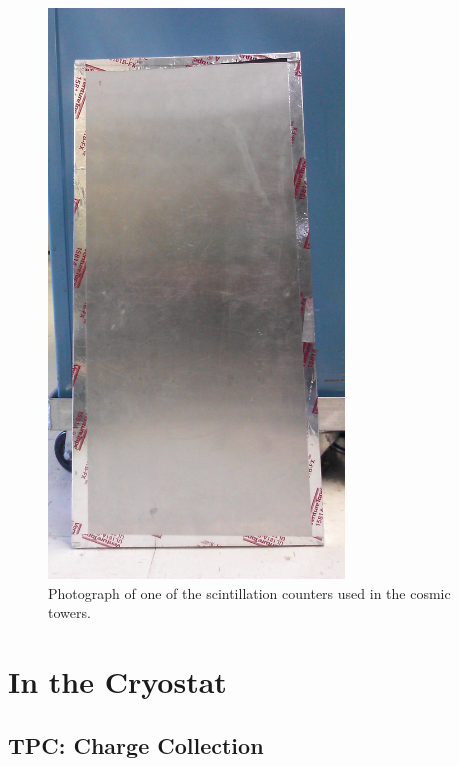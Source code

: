 \begin{figure}[h!]
\centering
 \includegraphics[angle=90,width=0.7\textwidth]{Chapter-2/Images/Cosmic_Paddle.jpg}
\caption{Photograph of one of the scintillation counters used in the cosmic towers. } 
\label{pic:cosmicpaddle}
\end{figure}






\section{In the Cryostat}
\subsection{TPC: Charge Collection}\label{sec:TPCCharge}
